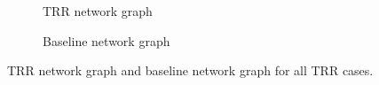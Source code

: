 \documentclass[10pt]{article}
\begin{document}
\begin{figure}[H]
\captionsetup{font=small}
    \begin{subfigure}{0.5\textwidth}
        \caption{TRR network graph}
        \label{trr}
    \end{subfigure}%
    \begin{subfigure}{0.5\textwidth}
        \caption{Baseline network graph}
        \label{baseline}
    \end{subfigure}
\caption{TRR network graph and baseline network graph for all TRR cases.}
\end{figure}
\end{document}
